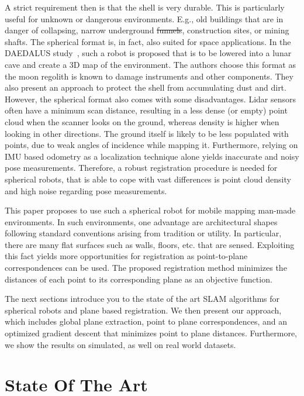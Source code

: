 \documentclass[5p]{elsarticle}
\providecommand{\DIFaddtex}[1]{{\protect\color{blue}\uwave{#1}}} %
\providecommand{\DIFdeltex}[1]{{\protect\color{red}\sout{#1}}}                      %
\providecommand{\DIFaddbegin}{} %
\providecommand{\DIFaddend}{} %
\providecommand{\DIFdelbegin}{} %
\providecommand{\DIFdelend}{} %
\providecommand{\DIFadd}[1]{\texorpdfstring{\DIFaddtex{#1}}{#1}} %
\providecommand{\DIFdel}[1]{\texorpdfstring{\DIFdeltex{#1}}{}} %
\begin{document}
A strict requirement then is that the shell is very durable.
This is particularly useful for unknown or dangerous environments.
E.g., old buildings that are in danger of collapsing, narrow underground \DIFdelbegin \DIFdel{funnels}\DIFdelend \DIFaddbegin \DIFadd{tunnels}\DIFaddend , construction sites, or mining shafts. 
The spherical format is, in fact, also suited for space applications.
In the DAEDALUS study~\cite{RossiMaurelliUnnithanetal.2021}, such a robot is proposed that is to be lowered into a lunar cave and create a 3D map of the environment. The authors choose this format as the moon regolith is known to damage instruments and other components.
They also present an approach to protect the shell from accumulating dust and dirt.
However, the spherical format also comes with some disadvantages.
Lidar sensors often have a minimum scan distance, resulting in a less dense (or empty) point cloud when the scanner looks on the ground, whereas density is higher when looking in other directions.
The ground itself is likely to be less populated with points, due to weak angles of incidence while mapping it.
Furthermore, relying on IMU based odometry as a localization technique alone yields inaccurate and noisy pose measurements.
Therefore, a robust registration procedure is needed for spherical robots, that is able to cope with vast differences is point cloud density and high noise regarding pose measurements.

This paper proposes to use such a spherical robot for mobile mapping man-made environments.
In such environments, one advantage are architectural shapes following standard conventions arising from tradition or utility. In particular, there are many flat surfaces such as walls, floors, etc. that are sensed.
Exploiting this fact yields more opportunities for registration as point-to-plane correspondences can be used.
The proposed registration method minimizes the distances of each point to its corresponding plane as an objective function.

The next sections introduce you to the state of the art SLAM algorithms for spherical robots and plane based registration.
We then present our approach, which includes global plane extraction, point to plane correspondences, and an optimized gradient descent that minimizes point to plane distances.
Furthermore, we show the results on simulated, as well on real world datasets. 

\section{State Of The Art}
\end{document}
